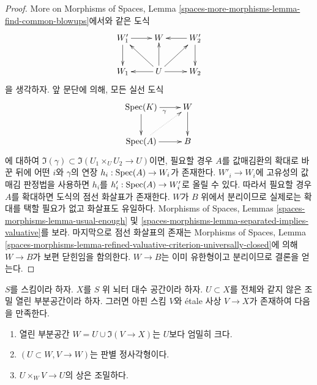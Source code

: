 \begin{proof}
\medskip\noindent
More on Morphisms of Spaces, Lemma
\ref{spaces-more-morphisms-lemma-find-common-blowups}에서와 같은 도식
$$
\xymatrix{
W_1' \ar[d] \ar[r] & W & W_2' \ar[l] \ar[d] \\
W_1 & U \ar[l] \ar[lu] \ar[u] \ar[ru] \ar[r] & W_2
}
$$
을 생각하자. 앞 문단에 의해, 모든 실선 도식
$$
\xymatrix{
\Spec(K) \ar[r]_\gamma  \ar[d] & W \ar[d] \\
\Spec(A) \ar@{..>}[ru] \ar[r] & B
}
$$
에 대하여 $\Im(\gamma) \subset
\Im(U_1 \times_U U_2 \to U)$이면, 필요할 경우 $A$를 값매김환의
확대로 바꾼 뒤에 어떤 $i$와 $\gamma$의 연장
$h_i : \mathop{\mathrm{Spec}}(A) \to W_i$가 존재한다.
$W'_i \to W_i$에 고유성의 값매김 판정법을 사용하면
$h_i$를 $h'_i : \mathop{\mathrm{Spec}}(A) \to W'_i$로 올릴 수 있다.
따라서 필요할 경우 $A$를 확대하면 도식의 점선 화살표가 존재한다.
$W$가 $B$ 위에서 분리이므로 실제로는 확대를 택할 필요가 없고
화살표도 유일하다. Morphisms of Spaces, Lemmas
\ref{spaces-morphisms-lemma-usual-enough} 및
\ref{spaces-morphisms-lemma-separated-implies-valuative}를 보라.
마지막으로 점선 화살표의 존재는 Morphisms of Spaces, Lemma
\ref{spaces-morphisms-lemma-refined-valuative-criterion-universally-closed}에
의해 $W \to B$가 보편 닫힌임을 함의한다.
$W \to B$는 이미 유한형이고 분리이므로 결론을 얻는다.
\end{proof}

\begin{lemma}
\label{lemma-filter-Noetherian-space}
$S$를 스킴이라 하자. $X$를 $S$ 위 뇌터 대수 공간이라 하자.
$U \subset X$를 전체와 같지 않은 조밀 열린 부분공간이라 하자.
그러면 아핀 스킴 $V$와 \'etale 사상 $V \to X$가 존재하여 다음을
만족한다.
\begin{enumerate}
\item 열린 부분공간 $W = U \cup \Im(V \to X)$는 $U$보다
엄밀히 크다.
\item $(U \subset W, V \to W)$는 판별 정사각형이다.
\item $U \times_W V \to U$의 상은 조밀하다.
\end{enumerate}
\end{lemma}

